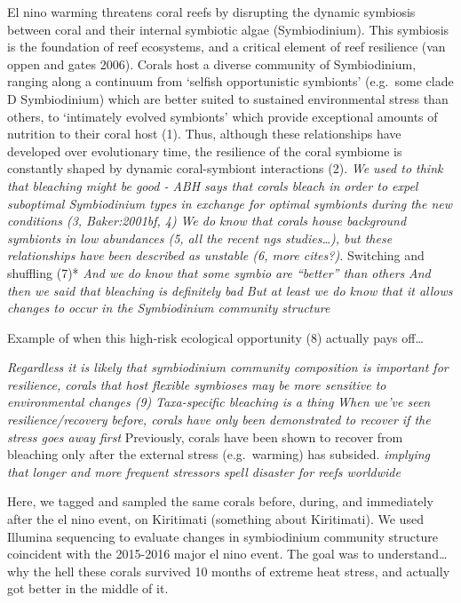 \documentclass[]{article}
\begin{document}
El nino warming threatens coral reefs by disrupting the dynamic
symbiosis between coral and their internal symbiotic algae
(Symbiodinium). This symbiosis is the foundation of reef ecosystems, and
a critical element of reef resilience (van oppen and gates 2006). Corals
host a diverse community of Symbiodinium, ranging along a continuum from
`selfish opportunistic symbionts' (e.g.~some clade D Symbiodinium) which
are better suited to sustained environmental stress than others, to
`intimately evolved symbionts' which provide exceptional amounts of
nutrition to their coral host (1). Thus, although these relationships
have developed over evolutionary time, the resilience of the coral
symbiome is constantly shaped by dynamic coral-symbiont interactions
(2). \emph{We used to think that bleaching might be good - ABH says that
corals bleach in order to expel suboptimal Symbiodinium types in
exchange for optimal symbionts during the new conditions (3,
Baker:2001bf, 4)} \emph{We do know that corals house background
symbionts in low abundances (5, all the recent ngs studies\ldots{}), but
these relationships have been described as unstable (6, more cites?).
}Switching and shuffling (7)* \emph{And we do know that some symbio are
``better'' than others} \emph{And then we said that bleaching is
definitely bad} \emph{But at least we do know that it allows changes to
occur in the Symbiodinium community structure}

Example of when this high-risk ecological opportunity (8) actually pays
off\ldots{}

\emph{Regardless it is likely that symbiodinium community composition is
important for resilience, corals that host flexible symbioses may be
more sensitive to environmental changes (9)} \emph{Taxa-specific
bleaching is a thing} \emph{When we've seen resilience/recovery before,
corals have only been demonstrated to recover if the stress goes away
first} Previously, corals have been shown to recover from bleaching only
after the external stress (e.g.~warming) has subsided. \emph{implying
that longer and more frequent stressors spell disaster for reefs
worldwide}

Here, we tagged and sampled the same corals before, during, and
immediately after the el nino event, on Kiritimati (something about
Kiritimati). We used Illumina sequencing to evaluate changes in
symbiodinium community structure coincident with the 2015-2016 major el
nino event. The goal was to understand\ldots{}why the hell these corals
survived 10 months of extreme heat stress, and actually got better in
the middle of it.
\end{document}
